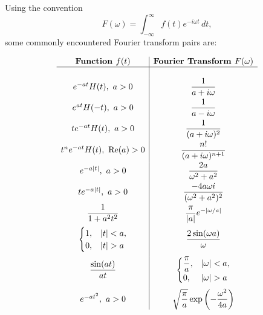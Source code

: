 \begin{conceptbox}
    Using the convention
    \[
        F(\omega)=\int_{-\infty}^{\infty}f(t)e^{-i\omega t}\,dt,
    \]
    some commonly encountered Fourier transform pairs are:

    \[
        \begin{array}{c|c}
            \textbf{Function } f(t)                 & \textbf{Fourier Transform } F(\omega)                       \\ \hline \\[1pt]
            e^{-at}H(t),\ a>0                       & \dfrac{1}{a+i\omega}                                        \\[8pt]
            e^{at}H(-t),\ a>0                       & \dfrac{1}{a-i\omega}                                        \\[8pt]
            te^{-at}H(t),\ a>0                      & \dfrac{1}{(a+i\omega)^2}                                    \\[8pt]
            t^ne^{-at}H(t),\ \operatorname{Re}(a)>0 & \dfrac{n!}{(a+i\omega)^{n+1}}                               \\[8pt]
            e^{-a|t|},\ a>0                         & \dfrac{2a}{\omega^2+a^2}                                    \\[8pt]
            te^{-a|t|},\ a>0                        & \dfrac{-4a\omega i}{(\omega^2+a^2)^2}                       \\[8pt]
            \dfrac{1}{1+a^2t^2}                     & \dfrac{\pi}{|a|}e^{-|\omega/a|}                             \\[10pt]
            \begin{cases}
                1, & |t|<a, \\
                0, & |t|>a
            \end{cases}
                                                    & \dfrac{2\sin(\omega a)}{\omega}                             \\[14pt]
            \dfrac{\sin(at)}{at}                    &
            \begin{cases}
                \dfrac{\pi}{a}, & |\omega|<a, \\
                0,              & |\omega|>a
            \end{cases}                                                                         \\[16pt]
            e^{-at^2},\ a>0                         & \sqrt{\dfrac{\pi}{a}}\exp\left(-\dfrac{\omega^2}{4a}\right)
        \end{array}
    \]
\end{conceptbox}

